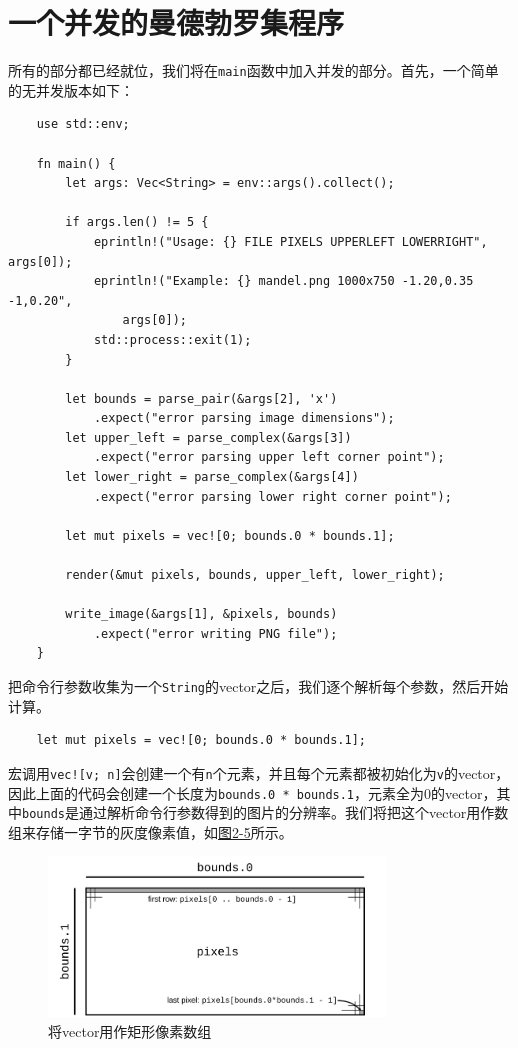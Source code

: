 \section{一个并发的曼德勃罗集程序}
所有的部分都已经就位，我们将在\texttt{main}函数中加入并发的部分。首先，一个简单的无并发版本如下：
\begin{verbatim}
    use std::env;

    fn main() {
        let args: Vec<String> = env::args().collect();

        if args.len() != 5 {
            eprintln!("Usage: {} FILE PIXELS UPPERLEFT LOWERRIGHT",     args[0]);
            eprintln!("Example: {} mandel.png 1000x750 -1.20,0.35   -1,0.20",
                args[0]);
            std::process::exit(1);
        }

        let bounds = parse_pair(&args[2], 'x')
            .expect("error parsing image dimensions");
        let upper_left = parse_complex(&args[3])
            .expect("error parsing upper left corner point");
        let lower_right = parse_complex(&args[4])
            .expect("error parsing lower right corner point");

        let mut pixels = vec![0; bounds.0 * bounds.1];

        render(&mut pixels, bounds, upper_left, lower_right);

        write_image(&args[1], &pixels, bounds)
            .expect("error writing PNG file");
    }
\end{verbatim}

把命令行参数收集为一个\texttt{String}的vector之后，我们逐个解析每个参数，然后开始计算。

\begin{verbatim}
    let mut pixels = vec![0; bounds.0 * bounds.1];
\end{verbatim}

宏调用\texttt{vec![v; n]}会创建一个有\texttt{n}个元素，并且每个元素都被初始化为\texttt{v}的vector，因此上面的代码会创建一个长度为\texttt{bounds.0 * bounds.1}，元素全为0的vector，其中\texttt{bounds}是通过解析命令行参数得到的图片的分辨率。我们将把这个vector用作数组来存储一字节的灰度像素值，如\hyperref[f2-5]{图2-5}所示。

\begin{figure}[htbp]
    \centering
    \includegraphics[width=0.8\textwidth]{../img/f2-5.png}
    \caption{将vector用作矩形像素数组}
    \label{f2-5}
\end{figure}

